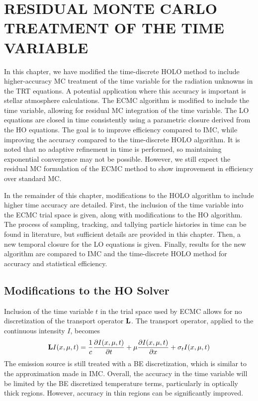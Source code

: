
\chapter{ \uppercase {Residual Monte Carlo Treatment of the Time Variable}}
\label{sec:time}

In this chapter, we have modified the time-discrete HOLO method to include higher-accuracy MC treatment
of the time variable for the radiation unknowns in the TRT equations. 
A potential application where this accuracy is important is stellar atmosphere calculations. 
The ECMC algorithm
is modified to include the time variable, allowing for residual MC integration of the time
variable. The LO equations are closed in time consistently using a parametric closure
derived from the HO equations. The goal is to improve
efficiency compared to IMC, while improving the accuracy compared to the time-discrete
HOLO algorithm.  It is
noted that no adaptive refinement in time is performed, so maintaining exponential convergence
may not be possible.  However, we still expect the residual MC formulation of the ECMC method
to show improvement in efficiency over standard MC.

In the remainder of this chapter, modifications to the HOLO algorithm to include higher
time accuracy are detailed.
First, the inclusion of the time variable into the ECMC trial
space is given, along with modifications to the HO algorithm.
The process of sampling, tracking, and tallying particle histories in time
can be found in literature\cite{wollaber_review,fnc,wollaber_thesis,cj_thesis}, but
sufficient details are provided in this chapter.  Then, a new temporal closure for the LO
equations is given.  Finally, results for the new algorithm are compared to
IMC and the time-discrete HOLO method for accuracy and statistical efficiency.  

\section{Modifications to the HO Solver}
\label{sec:time_ho}

Inclusion of the time variable $t$ in the trial space used by ECMC allows for no discretization of the
transport operator $\mathbf{L}$.  The transport operator, applied to the continuous intensity
$I$, becomes
\begin{equation}
    \mathbf{L}I(x,\mu,t) = \frac{1}{c}\frac{\partial I(x,\mu,t)}{\partial t}  + \mu \frac{\partial I(x,\mu,t)}{\partial x} + \sigma_t I(x,\mu,t)
\end{equation}
The emission source is still treated with a BE discretization, which is
similar to the approximation made in IMC.  Overall, the accuracy in the time variable will be limited by the BE discretized temperature
terms, particularly in optically thick
regions.  However, accuracy in thin regions can be significantly improved.

